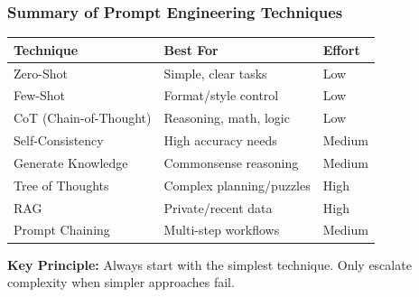 \begin{frame}[fragile]\frametitle{Summary of Prompt Engineering Techniques}

\begin{center}
\renewcommand{\arraystretch}{1.3}
\begin{tabular}{|l|p{5cm}|l|}
\hline
\textbf{Technique} & \textbf{Best For} & \textbf{Effort} \\
\hline
Zero-Shot & Simple, clear tasks & Low \\
Few-Shot & Format/style control & Low \\
CoT (Chain-of-Thought) & Reasoning, math, logic & Low \\
Self-Consistency & High accuracy needs & Medium \\
Generate Knowledge & Commonsense reasoning & Medium \\
Tree of Thoughts & Complex planning/puzzles & High \\
RAG & Private/recent data & High \\
Prompt Chaining & Multi-step workflows & Medium \\
\hline
\end{tabular}
\end{center}

\medskip
\textbf{Key Principle:} Always start with the simplest technique. Only escalate complexity when simpler approaches fail.

\end{frame}

